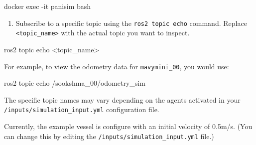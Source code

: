\documentclass[
  letterpaper,
  DIV=11,
  numbers=noendperiod]{scrreprt}
\newenvironment{Shaded}{\begin{snugshade}}{\end{snugshade}}
\newcommand{\AttributeTok}[1]{\textcolor[rgb]{0.40,0.45,0.13}{#1}}
\newcommand{\ExtensionTok}[1]{\textcolor[rgb]{0.00,0.23,0.31}{#1}}
\newcommand{\NormalTok}[1]{\textcolor[rgb]{0.00,0.23,0.31}{#1}}
\newcommand{\OperatorTok}[1]{\textcolor[rgb]{0.37,0.37,0.37}{#1}}
\providecommand{\tightlist}{%
  \setlength{\itemsep}{0pt}\setlength{\parskip}{0pt}}\usepackage{longtable,booktabs,array}
\begin{document}
\begin{enumerate}
\begin{Shaded}
\begin{Highlighting}[]
\ExtensionTok{docker}\NormalTok{ exec }\AttributeTok{{-}it}\NormalTok{ panisim bash}
\end{Highlighting}
\end{Shaded}

  \begin{enumerate}
  \def\labelenumii{\alph{enumii}.}
  \setcounter{enumii}{2}
  \tightlist
  \item
    Subscribe to a specific topic using the \texttt{ros2\ topic\ echo}
    command. Replace \texttt{\textless{}topic\_name\textgreater{}} with
    the actual topic you want to inspect.
  \end{enumerate}

\begin{Shaded}
\begin{Highlighting}[]
\ExtensionTok{ros2}\NormalTok{ topic echo }\OperatorTok{\textless{}}\NormalTok{topic\_name}\OperatorTok{\textgreater{}}
\end{Highlighting}
\end{Shaded}

  For example, to view the odometry data for \texttt{mavymini\_00}, you
  would use:

\begin{Shaded}
\begin{Highlighting}[]
\ExtensionTok{ros2}\NormalTok{ topic echo /sookshma\_00/odometry\_sim}
\end{Highlighting}
\end{Shaded}
\end{enumerate}

\begin{tcolorbox}[enhanced jigsaw, colback=white, toptitle=1mm, colframe=quarto-callout-note-color-frame, rightrule=.15mm, breakable, title=\textcolor{quarto-callout-note-color}{\faInfo}\hspace{0.5em}{Note}, toprule=.15mm, opacitybacktitle=0.6, opacityback=0, coltitle=black, leftrule=.75mm, colbacktitle=quarto-callout-note-color!10!white, arc=.35mm, titlerule=0mm, bottomtitle=1mm, bottomrule=.15mm, left=2mm]

The specific topic names may vary depending on the agents activated in
your \texttt{/inputs/simulation\_input.yml} configuration file.

\end{tcolorbox}

Currently, the example vessel is configure with an initial velocity of
0.5m/s. (You can change this by editing the
\texttt{/inputs/simulation\_input.yml} file.)
\end{document}
